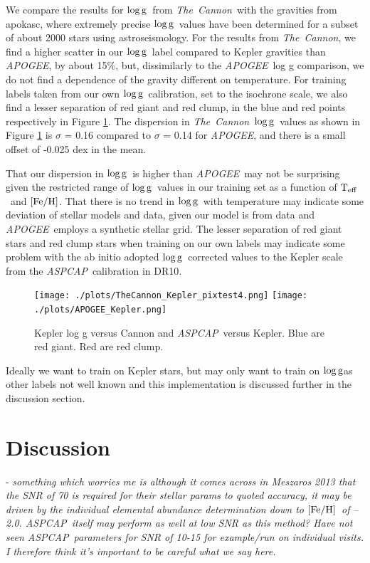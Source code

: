 \documentclass[12pt, preprint]{aastex}
\newcommand{\teff}{\mbox{$\rm T_{eff}$}}
\newcommand{\feh}{\mbox{$\rm [Fe/H]$}}
\newcommand{\logg}{\mbox{$\rm \log g$}}
\newcommand{\tc}{\textsl{The~Cannon}}
\newcommand{\apogee}{\textsl{APOGEE}}
\newcommand{\aspcap}{\textsl{ASPCAP}}
\begin{document}
We compare the results for \logg\ from \tc\ with the gravities from apokasc, where extremely precise \logg\ values have been determined for a subset of about 2000 stars using astroseismology. For the results from \tc, we find a higher scatter in our \logg\ label compared to Kepler gravities than \textit{APOGEE}, by about 15\%, but, dissimilarly to the \apogee\ log g comparison, we do not find a dependence of the gravity different on temperature. For training labels taken from our own \logg\ calibration, set to the isochrone scale, we also find a lesser separation of red giant and red clump, in the blue and red points respectively in Figure \ref{fig:kepler}. The dispersion in \tc\ \logg\ values as shown in Figure \ref{fig:kepler} is $\sigma$ = 0.16 compared to $\sigma$ =  0.14 for \textit{APOGEE}, and there is a small offset of -0.025 dex in the mean. 

That our dispersion in \logg\ is higher than \apogee\ may not be surprising given the restricted range of \logg\ values in our training set as a function of \teff\ and \feh. That there is no trend in \logg\ with temperature may indicate some deviation of stellar models and data, given our model is from data and \apogee\ employs a synthetic stellar grid. The lesser separation of red giant stars and red clump stars when training on our own labels may indicate some problem with the ab initio adopted \logg\ corrected values to the Kepler scale from the \aspcap\ calibration in DR10.

  \begin{figure}[h!]
 \texttt{[image: ./plots/TheCannon\_Kepler\_pixtest4.png]}
  \texttt{[image: ./plots/APOGEE\_Kepler.png]}
 \caption{Kepler log g versus Cannon and \aspcap\ versus Kepler. Blue are red giant. Red are red clump.}
\label{fig:kepler}
\end{figure}


Ideally we want to train on Kepler stars, but may only want to train on \logg as other labels not well known and this implementation is discussed further in the discussion section. 


\section{Discussion}




- \textit{something which worries me is although it comes across in Meszaros 2013 that the SNR of 70 is required for their stellar params to quoted accuracy, it may be driven by the individual elemental abundance determination down to \feh\ of --2.0. \aspcap\ itself may perform as well at low SNR as this method? Have not seen \aspcap\ parameters for SNR of 10-15 for example/run on individual visits. I therefore think it's important to be careful what we say here.} \\
\end{document}
